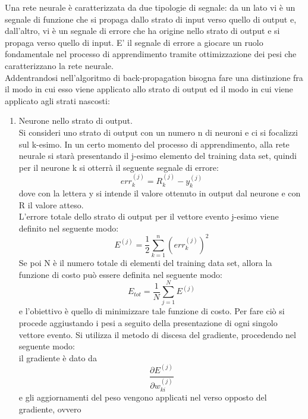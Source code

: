 Una rete neurale è caratterizzata da due tipologie di segnale: da un lato vi è un segnale di funzione che si propaga dallo strato di input verso quello di output e, dall'altro, vi è un segnale di errore che ha origine nello strato di output e si propaga verso quello di input. E' il segnale di errore a giocare un ruolo fondamentale nel processo di apprendimento tramite ottimizzazione dei pesi che caratterizzano la rete neurale. \\
Addentrandosi nell'algoritmo di back-propagation bisogna fare una distinzione fra il modo in cui esso viene applicato allo strato di output ed il modo in cui viene applicato agli strati nascosti:
\begin{enumerate}
	\item Neurone nello strato di output.\\
	Si consideri uno strato di output con un numero n di neuroni e ci si focalizzi sul k-esimo. In un certo momento del processo di apprendimento, alla rete neurale si starà presentando il j-esimo elemento del training data set, quindi per il neurone k si otterrà il seguente segnale di errore:
	\begin{equation}
	err_k^{(j)} = R_k^{(j)} - y_k^{(j)}
	\end{equation}
	dove con la lettera y si intende il valore ottenuto in output dal neurone e con R il valore atteso. \\
	L'errore totale dello strato di output per il vettore evento j-esimo viene definito nel seguente modo:
	\begin{equation}
	E^{(j)} = \frac{1}{2} \sum_{k=1}^{n} (err_k^{(j)})^2
	\end{equation}
	Se poi N è il numero totale di elementi del training data set, allora la funzione di costo può essere definita nel seguente modo:
	\begin{equation}
	E_{tot} = \frac{1}{N}\sum_{j=1}^{N} E^{(j)}
	\end{equation}
	e l'obiettivo è quello di minimizzare tale funzione di costo. Per fare ciò si procede aggiustando i pesi a seguito della presentazione di ogni singolo vettore evento.
	Si utilizza il metodo di discesa del gradiente, procedendo nel seguente modo: \\
	il gradiente è dato da
	\begin{equation}
	\frac{\partial E^{(j)} }{\partial w_{ki}^{(j)}}
	\end{equation}
	e gli aggiornamenti del peso vengono applicati nel verso opposto del gradiente, ovvero
	\begin{equation}

\end{equation}
\end{enumerate}
